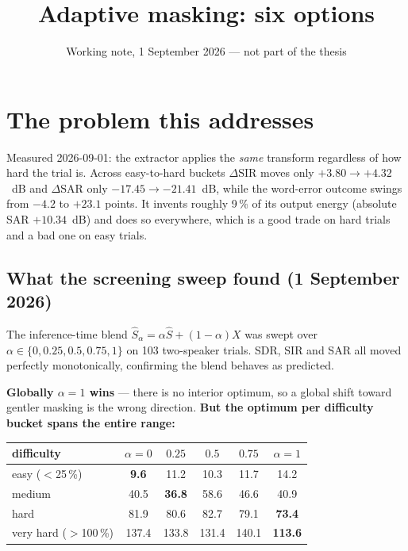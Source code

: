 \documentclass[11pt,a4paper]{article}
\title{\vspace{-1.5cm}\sffamily Adaptive masking: six options\vspace{-0.3em}}
\author{\small Working note, 1 September 2026 --- not part of the thesis}
\date{}
\begin{document}
\maketitle
\vspace{-1.2em}

\section*{The problem this addresses}

Measured 2026-09-01: the extractor applies the \emph{same} transform regardless
of how hard the trial is. Across easy-to-hard buckets $\Delta\text{SIR}$ moves only
$+3.80 \to +4.32$~dB and $\Delta\text{SAR}$ only $-17.45 \to -21.41$~dB, while the
word-error outcome swings from $-4.2$ to $+23.1$ points. It invents roughly
9\,\% of its output energy (absolute SAR $+10.34$~dB) and does so everywhere,
which is a good trade on hard trials and a bad one on easy trials.

\subsection*{What the screening sweep found (1 September 2026)}

The inference-time blend $\hat{S}_\alpha = \alpha\hat{S} + (1-\alpha)X$ was swept
over $\alpha \in \{0,0.25,0.5,0.75,1\}$ on 103 two-speaker trials. SDR, SIR and
SAR all moved perfectly monotonically, confirming the blend behaves as predicted.

\textbf{Globally $\alpha=1$ wins} --- there is no interior optimum, so a global
shift toward gentler masking is the wrong direction. \textbf{But the optimum per
difficulty bucket spans the entire range:}

\begin{center}\small
\begin{tabular}{@{}lccccc@{}}
\toprule
difficulty & $\alpha{=}0$ & $0.25$ & $0.5$ & $0.75$ & $\alpha{=}1$ \\
\midrule
easy ($<$25\,\%)      & \textbf{9.6} & 11.2 & 10.3 & 11.7 & 14.2 \\
medium                & 40.5 & \textbf{36.8} & 58.6 & 46.6 & 40.9 \\
hard                  & 81.9 & 80.6 & 82.7 & 79.1 & \textbf{73.4} \\
very hard ($>$100\,\%) & 137.4 & 133.8 & 131.4 & 140.1 & \textbf{113.6} \\
\bottomrule
\end{tabular}
\end{center}
\end{document}
